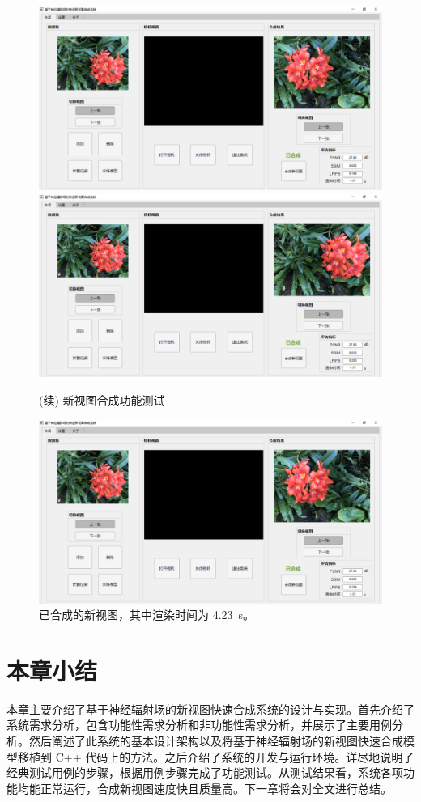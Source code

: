 \pagebreak
\begin{figure}[bhtp]
	\ContinuedFloat
	\centering
	{\includegraphics[width=0.45\linewidth]{figures/system/3-g.png}}
	{\includegraphics[width=0.45\linewidth]{figures/system/3-h.png}}
	\caption{(续) 新视图合成功能测试}
	\label{fig:viewsynthesis}
\end{figure}

\begin{figure}[htbp]
	\centering
	\includegraphics[width=0.95\linewidth]{figures/system/3-g.png}
	\caption{已合成的新视图，其中渲染时间为 \SI{4.23}{s}。}
	\label{fig:viewsynthesisBig}
\end{figure}
\section{本章小结}
本章主要介绍了基于神经辐射场的新视图快速合成系统的设计与实现。首先介绍了系统需求分析，包含功能性需求分析和非功能性需求分析，并展示了主要用例分析。然后阐述了此系统的基本设计架构以及将基于神经辐射场的新视图快速合成模型移植到 C++ 代码上的方法。之后介绍了系统的开发与运行环境。详尽地说明了经典测试用例的步骤，根据用例步骤完成了功能测试。从测试结果看，系统各项功能均能正常运行，合成新视图速度快且质量高。下一章将会对全文进行总结。

\cleardoublepage
